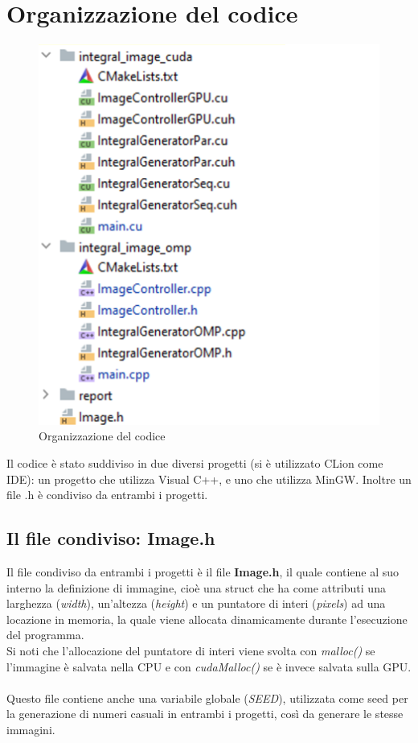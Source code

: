 \documentclass[10pt,twocolumn,letterpaper]{article}
\begin{document}
\section{Organizzazione del codice}
\begin{figure}[H]
\includegraphics[width=0.7\linewidth]{code/org.png}
\caption{\small Organizzazione del codice}
\label{organizzazione}
\end{figure}
Il codice è stato suddiviso in due diversi progetti (si è utilizzato CLion come IDE): un progetto che utilizza Visual C++, e uno che utilizza MinGW. Inoltre un file .h è condiviso da entrambi i progetti.


\subsection{Il file condiviso: Image.h}

Il file condiviso da entrambi i progetti è il file \textbf{Image.h}, il quale contiene al suo interno la definizione di immagine, cioè una struct che ha come attributi una larghezza (\textit{width}), un’altezza (\textit{height}) e un puntatore di interi (\textit{pixels}) ad una locazione in memoria, la quale viene allocata dinamicamente durante l'esecuzione del programma.\\
Si noti che l'allocazione del puntatore di interi viene svolta con \textit{malloc()} se l’immagine è salvata nella CPU e con \textit{cudaMalloc()} se è invece salvata sulla GPU.\\
\\
Questo file contiene anche una variabile globale (\textit{SEED}), utilizzata come seed per la generazione di numeri casuali in entrambi i progetti, così da generare le stesse immagini.
\end{document}
